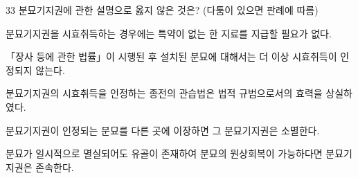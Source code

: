 \begin{question}{33}
분묘기지권에 관한 설명으로 옳지 않은 것은? (다툼이 있으면 판례에 따름)
\begin{choices}
  \item 분묘기지권을 시효취득하는 경우에는 특약이 없는 한 지료를 지급할 필요가 없다.
  \item 「장사 등에 관한 법률」이 시행된 후 설치된 분묘에 대해서는 더 이상 시효취득이 인정되지 않는다.
  \item 분묘기지권의 시효취득을 인정하는 종전의 관습법은 법적 규범으로서의 효력을 상실하였다.
  \item 분묘기지권이 인정되는 분묘를 다른 곳에 이장하면 그 분묘기지권은 소멸한다.
  \item 분묘가 일시적으로 멸실되어도 유골이 존재하여 분묘의 원상회복이 가능하다면 분묘기지권은 존속한다.
\end{choices}
\end{question}
